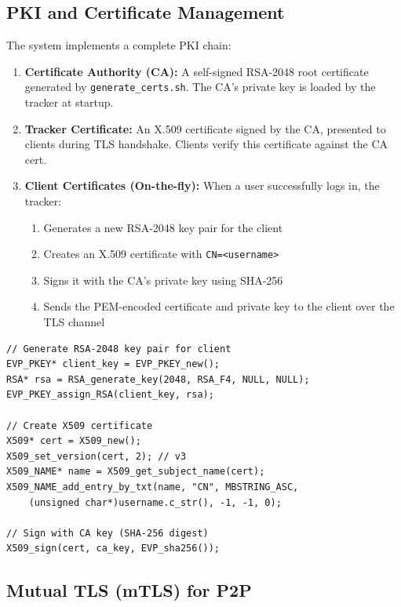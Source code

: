 \documentclass[12pt,a4paper]{article}
\begin{document}
\subsection{PKI and Certificate Management}

The system implements a complete PKI chain:

\begin{enumerate}
    \item \textbf{Certificate Authority (CA):} A self-signed RSA-2048 root certificate generated by \texttt{generate\_certs.sh}. The CA's private key is loaded by the tracker at startup.
    
    \item \textbf{Tracker Certificate:} An X.509 certificate signed by the CA, presented to clients during TLS handshake. Clients verify this certificate against the CA cert.
    
    \item \textbf{Client Certificates (On-the-fly):} When a user successfully logs in, the tracker:
    \begin{enumerate}
        \item Generates a new RSA-2048 key pair for the client
        \item Creates an X.509 certificate with \texttt{CN=<username>}
        \item Signs it with the CA's private key using SHA-256
        \item Sends the PEM-encoded certificate and private key to the client over the TLS channel
    \end{enumerate}
\end{enumerate}

\begin{lstlisting}[caption={On-the-fly Certificate Generation (Tracker)},label=lst:cert-gen]
// Generate RSA-2048 key pair for client
EVP_PKEY* client_key = EVP_PKEY_new();
RSA* rsa = RSA_generate_key(2048, RSA_F4, NULL, NULL);
EVP_PKEY_assign_RSA(client_key, rsa);

// Create X509 certificate
X509* cert = X509_new();
X509_set_version(cert, 2); // v3
X509_NAME* name = X509_get_subject_name(cert);
X509_NAME_add_entry_by_txt(name, "CN", MBSTRING_ASC, 
    (unsigned char*)username.c_str(), -1, -1, 0);

// Sign with CA key (SHA-256 digest)
X509_sign(cert, ca_key, EVP_sha256());
\end{lstlisting}

\subsection{Mutual TLS (mTLS) for P2P}
\end{document}
